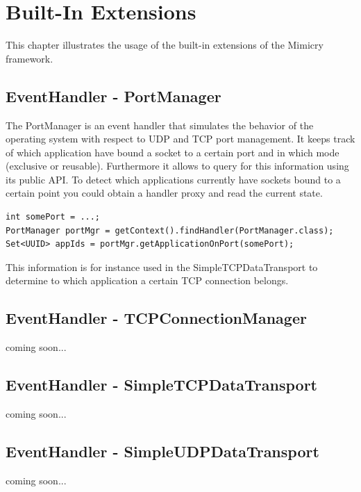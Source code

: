 \documentclass[a4paper,oneside]{book}
\begin{document}
\chapter{Built-In Extensions}
This chapter illustrates the usage of the built-in extensions of the Mimicry framework.

\section{EventHandler - PortManager}
The PortManager is an event handler that simulates the behavior of the operating system with respect to UDP and TCP port management. It keeps track of which application have bound a socket to a certain port and in which mode (exclusive or reusable). Furthermore it allows to query for this information using its public API. To detect which applications currently have sockets bound to a certain point you could obtain a handler proxy and read the current state.
\begin{lstlisting}
int somePort = ...;
PortManager portMgr = getContext().findHandler(PortManager.class);
Set<UUID> appIds = portMgr.getApplicationOnPort(somePort);
\end{lstlisting}
This information is for instance used in the SimpleTCPDataTransport to determine to which application a certain TCP connection belongs.

\section{EventHandler - TCPConnectionManager}
coming soon...

\section{EventHandler - SimpleTCPDataTransport}
coming soon...

\section{EventHandler - SimpleUDPDataTransport}
coming soon...
\end{document}
